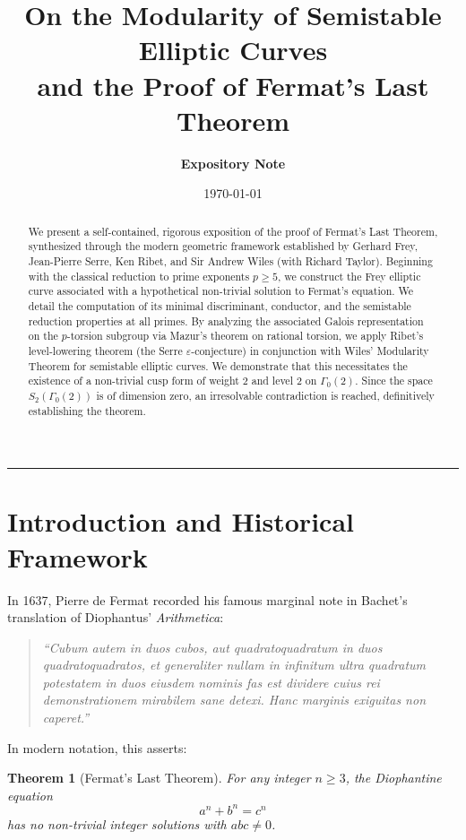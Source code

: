 \documentclass[11pt,a4paper]{article}
\title{\textbf{On the Modularity of Semistable Elliptic Curves\\and the Proof of Fermat's Last Theorem}}
\author{\textbf{Expository Note}}
\date{\today}
\theoremstyle{plain}
\newtheorem{theorem}{Theorem}[section]
\theoremstyle{definition}
\theoremstyle{remark}
\begin{document}
\maketitle

\begin{abstract}
We present a self-contained, rigorous exposition of the proof of Fermat's Last Theorem, synthesized through the modern geometric framework established by Gerhard Frey, Jean-Pierre Serre, Ken Ribet, and Sir Andrew Wiles (with Richard Taylor). Beginning with the classical reduction to prime exponents $p \ge 5$, we construct the Frey elliptic curve associated with a hypothetical non-trivial solution to Fermat's equation. We detail the computation of its minimal discriminant, conductor, and the semistable reduction properties at all primes. By analyzing the associated Galois representation on the $p$-torsion subgroup via Mazur's theorem on rational torsion, we apply Ribet's level-lowering theorem (the Serre $\varepsilon$-conjecture) in conjunction with Wiles' Modularity Theorem for semistable elliptic curves. We demonstrate that this necessitates the existence of a non-trivial cusp form of weight $2$ and level $2$ on $\Gamma_0(2)$. Since the space $S_2(\Gamma_0(2))$ is of dimension zero, an irresolvable contradiction is reached, definitively establishing the theorem.
\end{abstract}

\tableofcontents

\vspace{1em}
\hrule
\vspace{1.5em}

\section{Introduction and Historical Framework}

In 1637, Pierre de Fermat recorded his famous marginal note in Bachet's translation of Diophantus' \emph{Arithmetica}:
\begin{quote}
\emph{``Cubum autem in duos cubos, aut quadratoquadratum in duos quadratoquadratos, et generaliter nullam in infinitum ultra quadratum potestatem in duos eiusdem nominis fas est dividere cuius rei demonstrationem mirabilem sane detexi. Hanc marginis exiguitas non caperet.''}
\end{quote}
In modern notation, this asserts:

\begin{theorem}[Fermat's Last Theorem]
\label{thm:flt}
For any integer $n \ge 3$, the Diophantine equation
\begin{equation}
\label{eq:fermat}
a^n + b^n = c^n
\end{equation}
has no non-trivial integer solutions with $abc \neq 0$.
\end{theorem}
\end{document}
